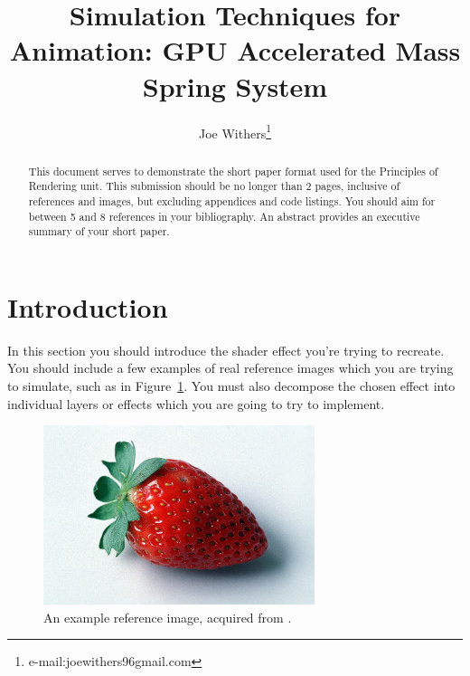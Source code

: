 \documentclass[]{acmsiggraph}
\title{Simulation Techniques for Animation: GPU Accelerated Mass Spring System}
\author{Joe Withers\thanks{e-mail:joewithers96gmail.com}}
\begin{document}

\maketitle


\begin{abstract}
This document serves to demonstrate the short paper format used for the Principles of Rendering unit. This submission should be no longer than 2 pages, inclusive of references and images, but excluding appendices and code listings. You should aim for between 5 and 8 references in your bibliography.
An abstract provides an executive summary of your short paper.
\end{abstract}

\section{Introduction} \label{sec:introduction}
In this section you should introduce the shader effect you're trying to recreate. You should include a few examples of real reference images which you are trying to simulate, such as in Figure~\ref{fig:reference}. You must also decompose the chosen effect into individual layers or effects which you are going to try to implement.

\begin{figure}[htbp]\centering
 \includegraphics[width=0.75\linewidth]{images/strawberry.jpg}
 \caption{\label{fig:reference}An example reference image, acquired from \protect\cite{fruits16}.}
\end{figure}
\end{document}
